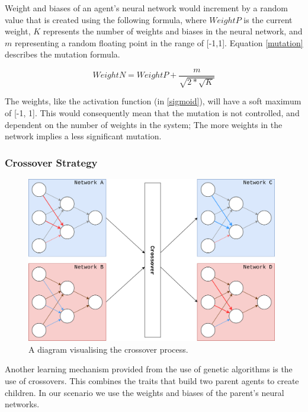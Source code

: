 \documentclass[12pt,a4paper]{article}
\begin{document}
            Weight and biases of an agent's neural network would increment by a random value that is created using the following formula, where $WeightP$ is the current weight, $K$ represents the number of weights and biases in the neural network, and $m$ representing a random floating point in the range of [-1,1]. Equation \ref{mutation} describes the mutation formula.

            \begin{equation} \label{mutation}
                WeightN = WeightP + \frac{m}{\sqrt{2 * \sqrt{K} }}
            \end{equation}

            The weights, like the activation function (in \ref{sigmoid}), will have a soft maximum of [-1, 1]. This would consequently mean that the mutation is not controlled, and dependent on the number of weights in the system; The more weights in the network implies a less significant mutation.

        \subsubsection{Crossover Strategy} \label{crossover_strategy}

                
            \begin{figure}[!ht]
                \centering
                \includegraphics[width=110mm]{crossover.png}
                \caption{A diagram visualising the crossover process.\label{crossoverpic}}
            \end{figure}

            Another learning mechanism provided from the use of genetic algorithms is the use of crossovers. This combines the traits that build two parent agents to create children. In our scenario we use the weights and biases of the parent's neural networks.
\end{document}
